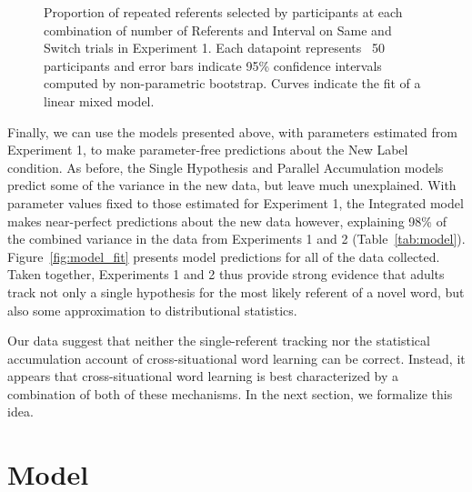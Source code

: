 \documentclass[man,floatsintext]{apa6}
\begin{document}
 \begin{figure}[!t]
	\caption{\label{fig:exp1_2_data} Proportion of repeated referents selected by participants at each combination of number of Referents and Interval on Same and Switch trials in Experiment 1. Each datapoint represents ~50 participants  and error bars indicate 95\% confidence intervals computed by non-parametric bootstrap. Curves indicate the fit of a linear mixed model.} 
\end{figure}

Finally, we can use the models presented above, with parameters estimated from Experiment 1, to make parameter-free predictions about the New Label condition. As before, the Single Hypothesis and Parallel Accumulation models predict some of the variance in the new data, but leave much unexplained. With parameter values fixed to those estimated for Experiment 1, the Integrated model makes near-perfect predictions about the new data however, explaining 98\% of the combined variance in the data from Experiments 1 and 2 (Table~\ref{tab:model}). Figure~\ref{fig:model_fit} presents model predictions for all of the data collected. Taken together, Experiments 1 and 2 thus provide strong evidence that adults track not only a single hypothesis for the most likely referent of a novel word, but also some approximation to distributional statistics.

Our data suggest that neither the single-referent tracking nor the statistical accumulation account of cross-situational word learning can be correct. Instead, it appears that cross-situational word learning is best characterized by a combination of both of these mechanisms. In the next section, we formalize this idea.

\section{Model}
\end{document}
